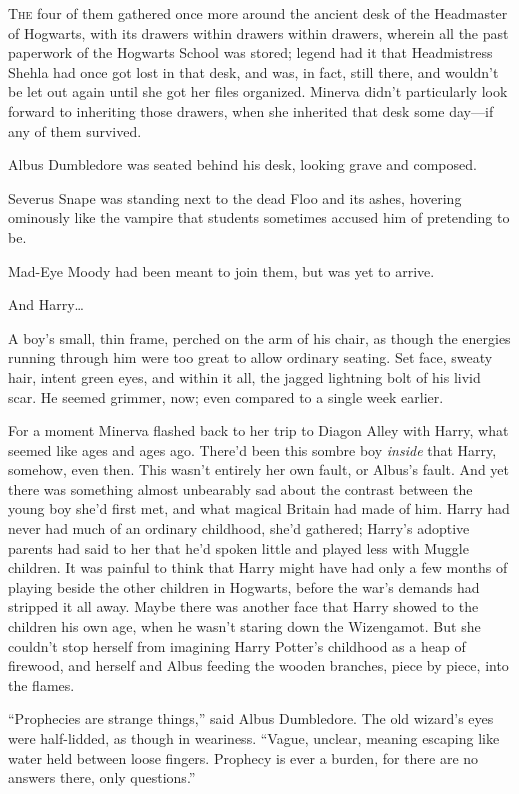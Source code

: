 \lettrine{T}{he} four of them gathered once more around the ancient desk of the Headmaster of Hogwarts, with its drawers within drawers within drawers, wherein all the past paperwork of the Hogwarts School was stored; legend had it that Headmistress Shehla had once got lost in that desk, and was, in fact, still there, and wouldn’t be let out again until she got her files organized. Minerva didn’t particularly look forward to inheriting those drawers, when she inherited that desk some day—if any of them survived.

Albus Dumbledore was seated behind his desk, looking grave and composed.

Severus Snape was standing next to the dead Floo and its ashes, hovering ominously like the vampire that students sometimes accused him of pretending to be.

Mad-Eye Moody had been meant to join them, but was yet to arrive.

And Harry…

A boy’s small, thin frame, perched on the arm of his chair, as though the energies running through him were too great to allow ordinary seating. Set face, sweaty hair, intent green eyes, and within it all, the jagged lightning bolt of his livid scar. He seemed grimmer, now; even compared to a single week earlier.

For a moment Minerva flashed back to her trip to Diagon Alley with Harry, what seemed like ages and ages ago. There’d been this sombre boy \emph{inside} that Harry, somehow, even then. This wasn’t entirely her own fault, or Albus’s fault. And yet there was something almost unbearably sad about the contrast between the young boy she’d first met, and what magical Britain had made of him. Harry had never had much of an ordinary childhood, she’d gathered; Harry’s adoptive parents had said to her that he’d spoken little and played less with Muggle children. It was painful to think that Harry might have had only a few months of playing beside the other children in Hogwarts, before the war’s demands had stripped it all away. Maybe there was another face that Harry showed to the children his own age, when he wasn’t staring down the Wizengamot. But she couldn’t stop herself from imagining Harry Potter’s childhood as a heap of firewood, and herself and Albus feeding the wooden branches, piece by piece, into the flames.

“Prophecies are strange things,” said Albus Dumbledore. The old wizard’s eyes were half-lidded, as though in weariness. “Vague, unclear, meaning escaping like water held between loose fingers. Prophecy is ever a burden, for there are no answers there, only questions.”

